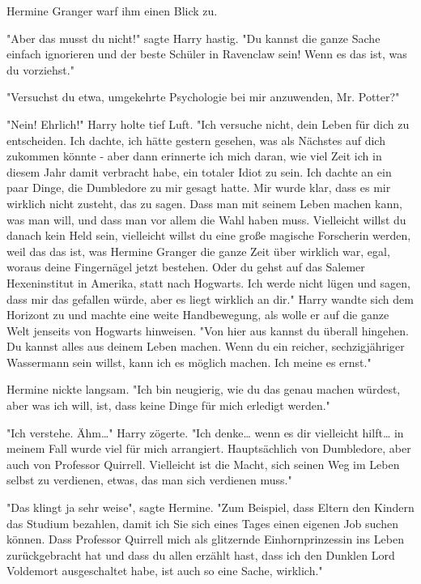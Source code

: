 {Hermine Granger warf ihm einen Blick zu.

"Aber das musst du nicht!" sagte Harry hastig. "Du kannst die ganze Sache einfach ignorieren und der beste Schüler in Ravenclaw sein! Wenn es das ist, was du vorziehst."

"Versuchst du etwa, umgekehrte Psychologie bei mir anzuwenden, Mr. Potter?"

"Nein! Ehrlich!" Harry holte tief Luft. "Ich versuche nicht, dein Leben für dich zu entscheiden. Ich dachte, ich hätte gestern gesehen, was als Nächstes auf dich zukommen könnte - aber dann erinnerte ich mich daran, wie viel Zeit ich in diesem Jahr damit verbracht habe, ein totaler Idiot zu sein. Ich dachte an ein paar Dinge, die Dumbledore zu mir gesagt hatte. Mir wurde klar, dass es mir wirklich nicht zusteht, das zu sagen. Dass man mit seinem Leben machen kann, was man will, und dass man vor allem die Wahl haben muss. Vielleicht willst du danach kein Held sein, vielleicht willst du eine große magische Forscherin werden, weil das das ist, was Hermine Granger die ganze Zeit über wirklich war, egal, woraus deine Fingernägel jetzt bestehen. Oder du gehst auf das Salemer Hexeninstitut in Amerika, statt nach Hogwarts. Ich werde nicht lügen und sagen, dass mir das gefallen würde, aber es liegt wirklich an dir." Harry wandte sich dem Horizont zu und machte eine weite Handbewegung, als wolle er auf die ganze Welt jenseits von Hogwarts hinweisen. "Von hier aus kannst du überall hingehen. Du kannst alles aus deinem Leben machen. Wenn du ein reicher, sechzigjähriger Wassermann sein willst, kann ich es möglich machen. Ich meine es ernst."

Hermine nickte langsam. "Ich bin neugierig, wie du das genau machen würdest, aber was ich will, ist, dass keine Dinge für mich erledigt werden."

"Ich verstehe. Ähm…" Harry zögerte. "Ich denke… wenn es dir vielleicht hilft… in meinem Fall wurde viel für mich arrangiert. Hauptsächlich von Dumbledore, aber auch von Professor Quirrell. Vielleicht ist die Macht, sich seinen Weg im Leben selbst zu verdienen, etwas, das man sich verdienen muss."

"Das klingt ja sehr weise", sagte Hermine. "Zum Beispiel, dass Eltern den Kindern das Studium bezahlen, damit ich Sie sich eines Tages einen eigenen Job suchen können. Dass Professor Quirrell mich als glitzernde Einhornprinzessin ins Leben zurückgebracht hat und dass du allen erzählt hast, dass ich den Dunklen Lord Voldemort ausgeschaltet habe, ist auch so eine Sache, wirklich."

}

